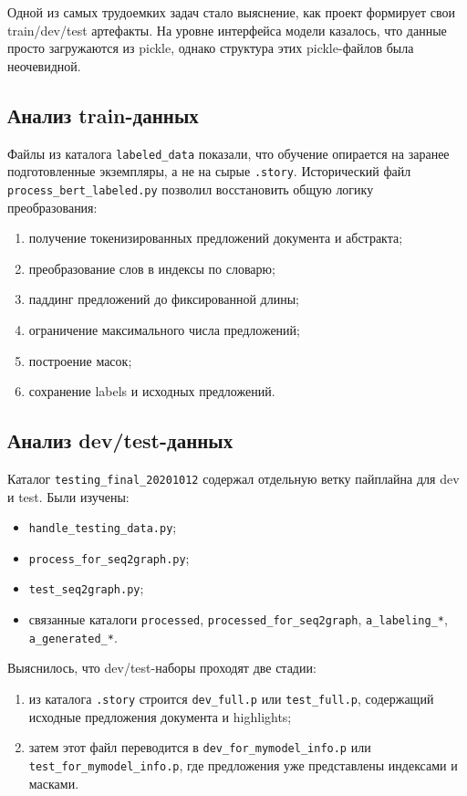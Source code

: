 \documentclass[12pt,a4paper]{article}
\begin{document}
Одной из самых трудоемких задач стало выяснение, как проект формирует свои train/dev/test
артефакты. На уровне интерфейса модели казалось, что данные просто загружаются из pickle,
однако структура этих pickle-файлов была неочевидной.

\subsection{Анализ train-данных}

Файлы из каталога \texttt{labeled\_data} показали, что обучение опирается на заранее
подготовленные экземпляры, а не на сырые \texttt{.story}. Исторический файл
\texttt{process\_bert\_labeled.py} позволил восстановить общую логику преобразования:

\begin{enumerate}
    \item получение токенизированных предложений документа и абстракта;
    \item преобразование слов в индексы по словарю;
    \item паддинг предложений до фиксированной длины;
    \item ограничение максимального числа предложений;
    \item построение масок;
    \item сохранение labels и исходных предложений.
\end{enumerate}

\subsection{Анализ dev/test-данных}

Каталог \texttt{testing\_final\_20201012} содержал отдельную ветку пайплайна для dev и
test. Были изучены:

\begin{itemize}
    \item \texttt{handle\_testing\_data.py};
    \item \texttt{process\_for\_seq2graph.py};
    \item \texttt{test\_seq2graph.py};
    \item связанные каталоги \texttt{processed}, \texttt{processed\_for\_seq2graph},
    \texttt{a\_labeling\_*}, \texttt{a\_generated\_*}.
\end{itemize}

Выяснилось, что dev/test-наборы проходят две стадии:

\begin{enumerate}
    \item из каталога \texttt{.story} строится \texttt{dev\_full.p} или
    \texttt{test\_full.p}, содержащий исходные предложения документа и highlights;
    \item затем этот файл переводится в \texttt{dev\_for\_mymodel\_info.p} или \\
    \texttt{test\_for\_mymodel\_info.p}, где предложения уже представлены индексами и
    масками.
\end{enumerate}
\end{document}
